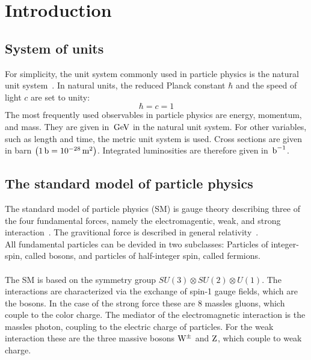 \chapter{Introduction}\label{chap:introduction}

\section{System of units}\label{sec:units}

For simplicity, the unit system commonly used in particle physics is the natural unit system~\cite{UnitSystem}. In natural units, the reduced Planck constant $\hbar$ and the speed of light $c$ are set to unity:
\begin{equation}
  \hbar=c=1
\end{equation}
The most frequently used observables in particle physics are energy, momentum, and mass. They are given in $\,\text{Ge\hspace{-.08em}V}$ in the natural unit system. For other variables, such as length and time, the metric unit system is used. Cross sections are given in barn $\left(1\,\text{b}=10^{-28}\,\text{m}^2\right)$. Integrated luminosities are therefore given in $\mbox{\ensuremath{\,\text{b}^\text{$-$1}}}$.

\section{The standard model of particle physics}\label{sec:SM}

The standard model of particle physics (SM) is gauge theory describing three of the four fundamental forces, namely the electromagentic, weak, and strong interaction~\cite{SM}. The gravitional force is described in general relativity~\cite{Einstein}.\\
All fundamental particles can be devided in two subclasses: Particles of integer-spin, called bosons, and particles of half-integer spin, called fermions.\\\\
The SM is based on the symmetry group $SU(3)\otimes SU(2)\otimes U(1)$. The interactions are characterized via the exchange of spin-1 gauge fields, which are the bosons. In the case of the strong force these are 8 massles gluons, which couple to the color charge. The mediator of the electromagnetic interaction is the massles photon, coupling to the electric charge of particles. For the weak interaction these are the three massive bosons $\mathrm{W}^\pm$ and $\mathrm{Z}$, which couple to weak charge.\\\\

